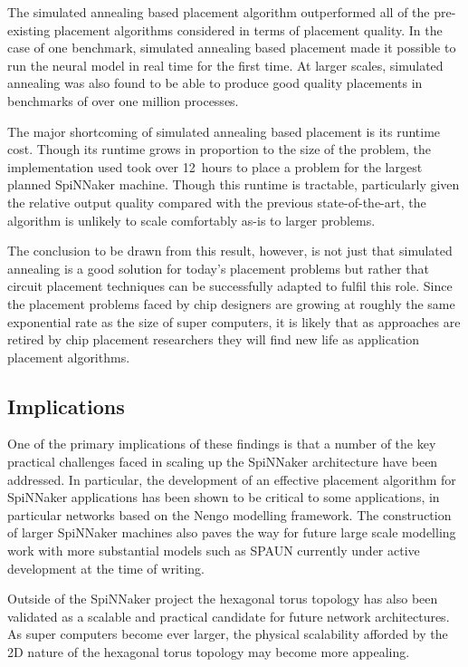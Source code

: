		The simulated annealing based placement algorithm outperformed all of the
		pre-existing placement algorithms considered in terms of placement quality.
		In the case of one benchmark, simulated annealing based placement made it
		possible to run the neural model in real time for the first time. At larger
		scales, simulated annealing was also found to be able to produce good
		quality placements in benchmarks of over one million processes.
		
		The major shortcoming of simulated annealing based placement is its runtime
		cost. Though its runtime grows in proportion to the size of the problem,
		the implementation used took over 12~hours to place a problem for the
		largest planned SpiNNaker machine. Though this runtime is tractable,
		particularly given the relative output quality compared with the previous
		state-of-the-art, the algorithm is unlikely to scale comfortably as-is to
		larger problems.
		
		The conclusion to be drawn from this result, however, is not just that
		simulated annealing is a good solution for today's placement problems but
		rather that circuit placement techniques can be successfully adapted to
		fulfil this role. Since the placement problems faced by chip designers are
		growing at roughly the same exponential rate as the size of super
		computers, it is likely that as approaches are retired by chip placement
		researchers they will find new life as application placement algorithms.
	
	\subsection{Implications}
		
		One of the primary implications of these findings is that a number of the
		key practical challenges faced in scaling up the SpiNNaker architecture
		have been addressed. In particular, the development of an effective
		placement algorithm for SpiNNaker applications has been shown to be
		critical to some applications, in particular networks based on the Nengo
		modelling framework. The construction of larger SpiNNaker machines also
		paves the way for future large scale modelling work with more substantial
		models such as SPAUN currently under active development at the time of
		writing.
		
		Outside of the SpiNNaker project the hexagonal torus topology has also been
		validated as a scalable and practical candidate for future network
		architectures. As super computers become ever larger, the physical
		scalability afforded by the 2D nature of the hexagonal torus topology may
		become more appealing.
		
